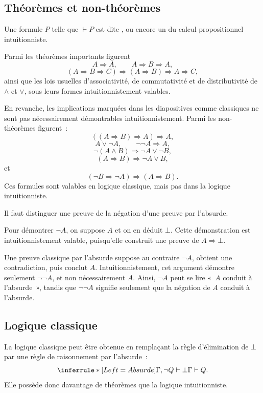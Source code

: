 \subsection{Théorèmes et non-théorèmes}

\thingy Une formule $P$ telle que $\vdash P$ est dite
, ou encore un  du calcul
propositionnel intuitionniste.

Parmi les théorèmes importants figurent
\[
A\Rightarrow A,
\qquad
A\Rightarrow B\Rightarrow A,
\]
\[
(A\Rightarrow B\Rightarrow C)
\Rightarrow(A\Rightarrow B)\Rightarrow A\Rightarrow C,
\]
ainsi que les lois usuelles d'associativité, de commutativité et de
distributivité de $\land$ et $\lor$, sous leurs formes
intuitionnistement valables.

En revanche, les implications marquées dans les diapositives comme
classiques ne sont pas nécessairement démontrables
intuitionnistement. Parmi les non-théorèmes figurent :
\[
((A\Rightarrow B)\Rightarrow A)\Rightarrow A,
\]
\[
A\lor\neg A,
\qquad
\neg\neg A\Rightarrow A,
\]
\[
\neg(A\land B)\Rightarrow\neg A\lor\neg B,
\]
\[
(A\Rightarrow B)\Rightarrow\neg A\lor B,
\]
et
\[
(\neg B\Rightarrow\neg A)\Rightarrow(A\Rightarrow B).
\]
Ces formules sont valables en logique classique, mais pas dans la
logique intuitionniste.

\thingy Il faut distinguer une preuve de la négation d'une preuve par
l'absurde.

Pour démontrer $\neg A$, on suppose $A$ et on en déduit $\bot$. Cette
démonstration est intuitionnistement valable, puisqu'elle construit une
preuve de $A\Rightarrow\bot$.

Une preuve classique par l'absurde suppose au contraire $\neg A$,
obtient une contradiction, puis conclut $A$. Intuitionnistement, cet
argument démontre seulement $\neg\neg A$, et non nécessairement $A$.
Ainsi, $\neg A$ peut se lire « $A$ conduit à l'absurde », tandis que
$\neg\neg A$ signifie seulement que la négation de $A$ conduit à
l'absurde.

\subsection{Logique classique}

\thingy La logique classique peut être obtenue en remplaçant la règle
d'élimination de $\bot$ par une règle de raisonnement par l'absurde :
\[
\inferrule*[Left={Absurde}]
 {\Gamma,\neg Q\vdash\bot}
 {\Gamma\vdash Q}.
\]
Elle possède donc davantage de théorèmes que la logique
intuitionniste.

